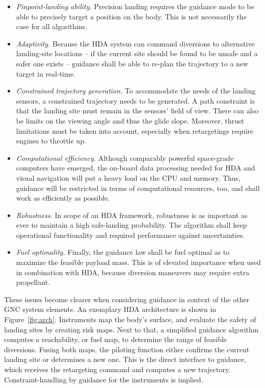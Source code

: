 \documentclass[%
]{aiaa-tc}
\begin{document}
\begin{itemize}
    \item \emph{Pinpoint-landing ability.} Precision landing requires the
          guidance mode to be able to precisely target a position on the body.
          This is not necessarily the case for all algorithms.
    \item \emph{Adaptivity.} Because the HDA system can command diversions to
          alternative landing-site locations -- if the current site should be found
          to be unsafe and a safer one exists -- guidance shall be able to re-plan
          the trajectory to a new target in real-time.
    \item \emph{Constrained trajectory generation.} To accommodate the needs of
          the landing sensors, a constrained trajectory needs to be generated. A
          path constraint is that the landing site must remain in the sensors'
          field of view. There can also be limits on the viewing angle and thus
          the glide slope. Moreover, thrust limitations must be taken into
          account, especially when retargetings require engines to throttle up.
    \item \emph{Computational efficiency.} Although comparably powerful
          space-grade computers have emerged, the on-board data processing
          needed for HDA and visual navigation will put a heavy load on the CPU
          and memory. Thus, guidance will be restricted in terms of
          computational resources, too, and shall work as efficiently as
          possible.
    \item \emph{Robustness.} In scope of an HDA framework, robustness is as
          important as ever to maintain a high safe-landing probability.  The
          algorithm shall keep operational functionality and required
          performance against uncertainties.
    \item \emph{Fuel optimality.} Finally, the guidance law shall be fuel
          optimal as to maximize the feasible payload mass. This is of elevated
          importance when used in combination with HDA, because diversion
          maneuvers may require extra propellant.
\end{itemize}

These issues become clearer when considering guidance in context of the
other GNC system elements. An exemplary HDA architecture is shown in
Figure~\ref{fig:arch}. Instruments map the body's surface, and evaluate the
safety of landing sites by creating risk maps. Next to that, a simplified
guidance algorithm computes a reachability, or fuel map, to determine the range
of feasible diversions. Fusing both maps, the piloting function either confirms
the current landing site or determines a new one. This is the direct interface
to guidance, which receives the retargeting command and computes a new
trajectory. Constraint-handling by guidance for the instruments is implied.
\end{document}
